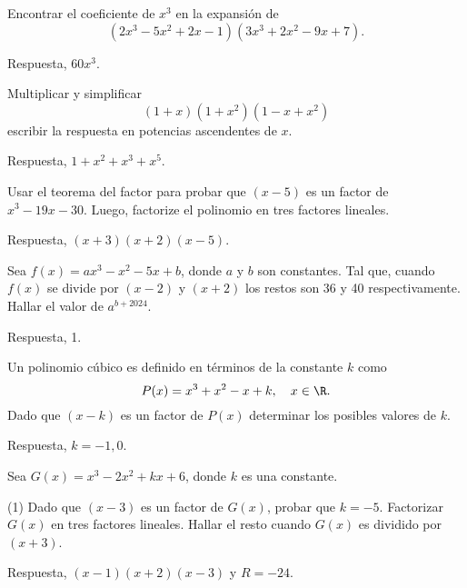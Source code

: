 \begin{exercise}[*]
    Encontrar el coeficiente de $x^3$ en la expansión de
    \[
        (2x^3 - 5x^2 + 2x - 1)(3x^3 + 2x^2 - 9x + 7).
    \]

    Respuesta, $\boxed{60x^3}$.
\end{exercise}

\begin{exercise}[*]
    Multiplicar y simplificar
    \[
        (1 + x)(1 + x^2)(1 - x + x^2)
    \]
    escribir la respuesta en potencias ascendentes de $x$.

    Respuesta, $\boxed{1 + x^2 + x^3 + x^5}$.
\end{exercise}

\begin{exercise}
    Usar el teorema del factor para probar que $(x - 5)$ es un factor de $x^3 - 19x - 30$.
    Luego, factorize el polinomio en tres factores lineales.

    Respuesta, $\boxed{(x + 3)(x + 2)(x - 5)}$.
\end{exercise}

\begin{exercise}
    Sea $f(x) = ax^3 - x^2 - 5x + b$, donde $a$ y $b$ son constantes.
    Tal que, cuando $f(x)$ se divide por $(x - 2)$ y $(x + 2)$ los restos son 36 y 40 respectivamente.
    Hallar el valor de $a^{b + 2024}$.

    Respuesta, 1.
\end{exercise}

\begin{exercise}
    Un polinomio cúbico es definido en términos de la constante $k$ como
    \[
        P(x) = x^3 + x^2 - x + k,\quad x \in \R.
    \]
    Dado que $(x - k)$ es un factor de $P(x)$ determinar los posibles valores de $k$.

    Respuesta, $\boxed{k = -1, 0}$.
\end{exercise}

\begin{exercise}
    Sea $G(x) = x^3 - 2x^2 + kx + 6$, donde $k$ es una constante.
    \begin{tasks}[label=\alph*.](1)
        \task Dado que $(x - 3)$ es un factor de $G(x)$, probar que $k = -5$.
        \task Factorizar $G(x)$ en tres factores lineales.
        \task Hallar el resto cuando $G(x)$ es dividido por $(x + 3)$.
    \end{tasks}
    Respuesta, $\boxed{(x - 1)(x + 2)(x - 3)}$ y $\boxed{R = -24}$.
\end{exercise}

